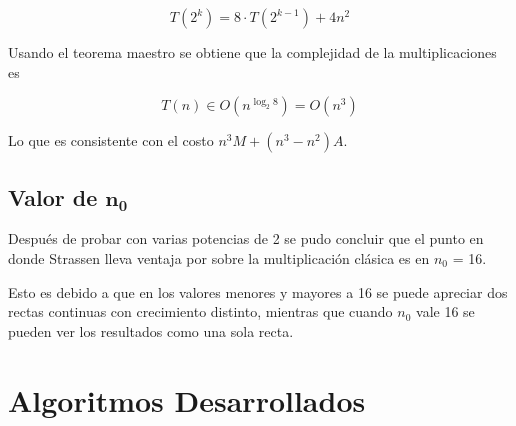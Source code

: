 \documentclass[12pt,letterpaper]{scrartcl}
\begin{document}
$$ T(2^k) = 8\cdot T( 2^{k-1}) + 4n^2 $$

Usando el teorema maestro se obtiene que la complejidad de la multiplicaciones es

$$T(n) \in O(n^{\log_2 8}) = O ( n^{3} )$$

Lo que es consistente con el costo $n^3M + (n^3 - n^2)A$.

\subsection{Valor de $\mathbf{n_0}$}

Después de probar con varias potencias de 2 se pudo concluir que el punto en donde Strassen lleva ventaja por sobre la multiplicación clásica es en $n_0$ = 16. 

Esto es debido a que en los valores menores y mayores a 16 se puede apreciar dos rectas continuas con crecimiento distinto, mientras que cuando $n_0$ vale 16 se pueden ver los resultados como una sola recta.


\section{Algoritmos Desarrollados}
\end{document}
